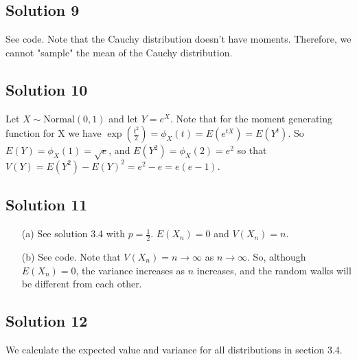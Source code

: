 \subsection*{Solution 9}

See code.
Note that the Cauchy distribution doesn't have moments.
Therefore, we cannot "sample" the mean of the Cauchy distribution.


\subsection*{Solution 10}

Let $X \sim \mathrm{Normal}(0, 1)$ and let $Y = e^X$.
Note that for the moment generating function for X we have $\exp(\frac{t^2}{2}) = \phi_X(t) = E(e^{tX}) = E(Y^t)$.
So $E(Y) = \phi_X(1) = \sqrt{e}$, and $E(Y^2) = \phi_X(2) = e^2$ so that $V(Y) = E(Y^2) - E(Y)^2 = e^2 - e = e(e - 1)$.


\subsection*{Solution 11}

\begin{itemize}
    \item[(a)] See solution 3.4 with $p = \frac{1}{2}$.
        $E(X_n) = 0$ and $V(X_n) = n$.
    \item[(b)] See code.
        Note that $V(X_n) = n \to \infty$ as $n \to \infty$.
        So, although $E(X_n) = 0$, the variance increases as $n$ increases, and the random walks will be different from each other.
\end{itemize}


\subsection*{Solution 12}

We calculate the expected value and variance for all distributions in section 3.4.

